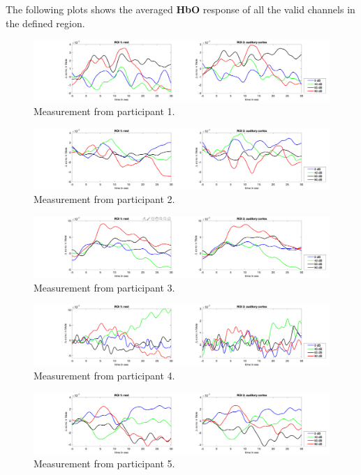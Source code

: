 The following plots shows the averaged \textbf {HbO} response of all the valid channels in the defined region.
\begin{figure}[H]
  \centering
    \includegraphics[scale=.29]{bilder/ROI/sub_chang_s_HbO.png}
  \caption{Measurement from participant  1.}
  \label{fig:somesignal}
\end{figure}

\begin{figure}[H]
  \centering
    \includegraphics[scale=.29]{bilder/ROI/sub_gleb2_s_HbO.png}
  \caption{Measurement from participant  2.}
  \label{fig:somesignal}
\end{figure}

\begin{figure}[H]
  \centering
    \includegraphics[scale=.29]{bilder/ROI/sub_jonas_s_HbO.png}
  \caption{Measurement from participant  3.}
  \label{fig:somesignal}
\end{figure}

\begin{figure}[H]
  \centering
    \includegraphics[scale=.29]{bilder/ROI/sub_lin_s_HbO.png}
  \caption{Measurement from participant  4.}
  \label{fig:somesignal}
\end{figure}

\begin{figure}[H]
  \centering
    \includegraphics[scale=.29]{bilder/ROI/sub_lukas_s_HbO.png}
  \caption{Measurement from participant 5.}
  \label{fig:somesignal}
\end{figure}

